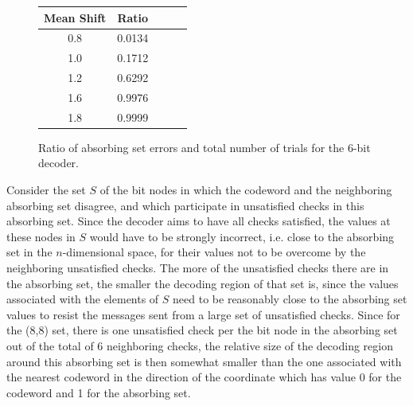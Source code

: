 



\begin{figure}\center\begin{tabular}{|c|c|c|c|c|}
  \hline
  Mean Shift & Ratio  \\
  \hline
  0.8 & 0.0134  \\
  1.0 & 0.1712  \\
  1.2 & 0.6292  \\
  1.6 & 0.9976  \\
  1.8 & 0.9999  \\
  \hline
\end{tabular}
\caption{Ratio of absorbing set errors and total number of trials
for the 6-bit decoder.}\label{tab1}
\end{figure}


Consider the set $S$ of the bit nodes in which the codeword and the
neighboring absorbing set disagree, and which participate in
unsatisfied checks in this absorbing set. Since the decoder aims to
have all checks satisfied, the values at these nodes in $S$ would have
to be strongly incorrect, i.e. close to the absorbing set in the
$n$-dimensional space, for their values not to be overcome by the
neighboring unsatisfied checks. The more of the unsatisfied checks
there are in the absorbing set, the smaller the decoding region of
that set is, since the values associated with the elements of $S$ need
to be reasonably close to the absorbing set values to resist the
messages sent from a large set of unsatisfied checks. Since for the
(8,8) set, there is one unsatisfied check per the bit node in the
absorbing set out of the total of 6 neighboring checks, the relative
size of the decoding region around this absorbing set is then somewhat
smaller than the one associated with the nearest codeword in the
direction of the coordinate which has value 0 for the codeword and 1
for the absorbing set.

